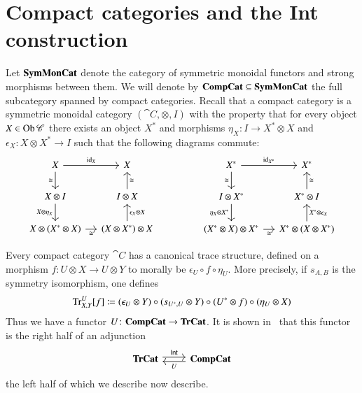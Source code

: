 \documentclass[12pt,oneside,article,draft]{memoir}
\begin{document}
{\begin{definition}
\end{definition}

}%

\section{Compact categories and the Int construction}\label{sec:compact and int}

Let $\mathbf{SymMonCat}$ denote the category of symmetric monoidal functors and strong morphisms between them. We will denote by $\mathbf{CompCat}\subseteq\mathbf{SymMonCat}$ the full subcategory spanned by compact categories. Recall that a compact category is a symmetric monoidal category $(\cat{C},\otimes,I)$ with the property that for every object $X\in\operatorname{Ob}\mathscr{C}$ there exists an object $X^*$ and morphisms $\eta_X\colon I\to X^*\otimes X$ and $\epsilon_X\colon X\otimes X^*\to I$ such that the following diagrams commute:
$$\begin{tikzcd}[column sep=small]
X\arrow[r,"\id_X"]\arrow[d,"\cong"']&X\\
X\otimes I\arrow[d,"X\otimes\eta_X"']&I\otimes X\arrow[u,"\cong"']\\
X\otimes(X^*\otimes X)\arrow[r,"\cong"']&(X\otimes X^*)\otimes X\arrow[u,"\epsilon_X\otimes X"']
\end{tikzcd}
\hspace{.6in}
\begin{tikzcd}[column sep=small]
X^*\arrow[r,"\id_{X^*}"]\arrow[d,"\cong"']&X^*\\
I\otimes X^*\arrow[d,"\eta_X\otimes X^*"']&X^*\otimes I\arrow[u,"\cong"']\\
(X^*\otimes X)\otimes X^*\arrow[r,"\cong"']&X^*\otimes (X\otimes X^*)\arrow[u,"X^*\otimes\epsilon_X"']
\end{tikzcd}
$$

Every compact category $\cat{C}$ has a canonical trace structure, defined on a morphism $f\colon U\otimes X\to U\otimes Y$ to morally be $\epsilon_U\circ f\circ \eta_U$. More precisely, if $s_{A,B}$ is the symmetry isomorphism, one defines
$$\operatorname{Tr}^U_{X,Y}[f]\coloneqq(\epsilon_U\otimes Y)\circ (s_{U^*,U}\otimes Y)\circ (U^*\otimes f)\circ (\eta_U\otimes X)$$
Thus we have a functor 
$U\colon\mathbf{CompCat}\to\mathbf{TrCat}$. It is shown in~\cite{JoyalStreetVerity} that this functor is the right half of an adjunction
\begin{equation}\label{dia:traced compact adjunction}
\begin{tikzcd}
\TrCat\arrow[r,shift left=.5ex, "\Int"]&\CompCat\arrow[l,shift left=.5ex,"U"]
\end{tikzcd}
\end{equation}
the left half of which we describe now describe. 
\end{document}
